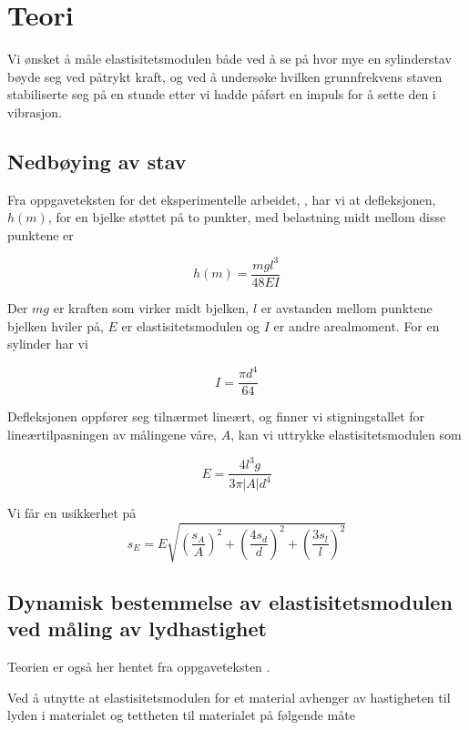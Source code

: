 \documentclass[a4paper,11pt, twocolumn]{article}
\begin{document}
\section{Teori}
Vi ønsket å måle elastisitetsmodulen både ved å se på hvor mye en sylinderstav bøyde seg ved påtrykt kraft, og ved å undersøke hvilken grunnfrekvens staven stabiliserte seg på en stunde etter vi hadde påført en impuls for å sette den i vibrasjon.
\subsection{Nedbøying av stav}
Fra oppgaveteksten for det eksperimentelle arbeidet, \cite{oppgavetekst}, har vi at defleksjonen, $h(m)$, for en bjelke støttet på to punkter, med belastning midt mellom disse punktene er

\begin{equation}
	h(m) = \frac{mgl^3}{48EI}
	\label{eq:h}
\end{equation}

Der $mg$ er kraften som virker midt bjelken, $l$ er avstanden mellom punktene bjelken hviler på, $E$ er elastisitetsmodulen og $I$ er andre arealmoment. For en sylinder har vi

\begin{equation}
	I = \frac{\pi d^4}{64}
\end{equation}

Defleksjonen oppfører seg tilnærmet lineært, og finner vi stigningstallet for lineærtilpasningen av målingene våre, $A$, kan vi uttrykke elastisitetsmodulen som  

\begin{equation}
	E = \frac{4l^3g}{3\pi |A|d^4}
	\label{eq:elastisitetsmodulDefleksjon}
\end{equation}

Vi får en usikkerhet på
\begin{equation}
	s_E = E\sqrt{\left(\frac{s_A}{A}\right)^2+\left(\frac{4s_d}{d}\right)^2+\left(\frac{3s_l}{l}\right)^2}	
	\label{eq:feilDefleksjon}
\end{equation}


\subsection{Dynamisk bestemmelse av elastisitetsmodulen ved måling av lydhastighet}
Teorien er også her hentet fra oppgaveteksten \cite{oppgavetekst}. 

Ved å utnytte at elastisitetsmodulen for et material avhenger av hastigheten til lyden i materialet og tettheten til materialet på følgende måte
\end{document}
